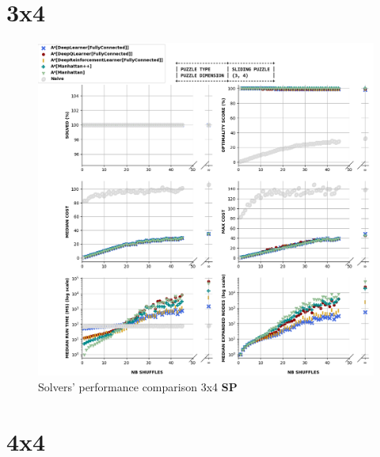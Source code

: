 \section{3x4}

\label{ssec:34SPSC}

\begin{figure}[H]
\centering
\includegraphics[scale=0.63]{./Figures/34SPPerformance}
\caption[34SPPerformance]{Solvers' performance comparison 3x4 \textbf{SP}}
\label{fig:34SPPerformance}
\end{figure}






\section{4x4}



\label{ssec:44SPSC}

